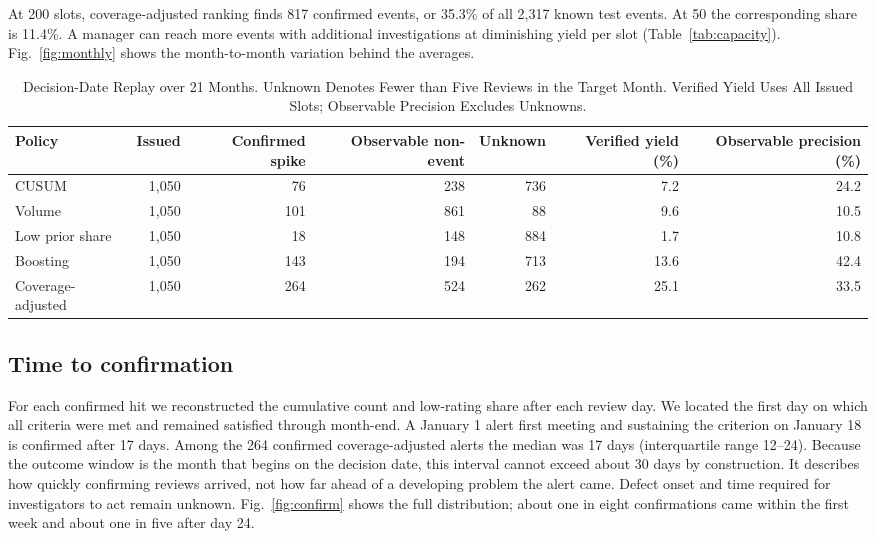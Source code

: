 \documentclass[conference]{IEEEtran}
\begin{document}
At 200 slots, coverage-adjusted ranking finds 817 confirmed events, or 35.3\% of all 2,317 known test events. At 50 the corresponding share is 11.4\%. A manager can reach more events with additional investigations at diminishing yield per slot (Table~\ref{tab:capacity}). Fig.~\ref{fig:monthly} shows the month-to-month variation behind the averages.

\begin{table}[t]
\caption{Decision-Date Replay over 21 Months. Unknown Denotes Fewer than Five Reviews in the Target Month. Verified Yield Uses All Issued Slots; Observable Precision Excludes Unknowns.}
\label{tab:replay}
\centering\footnotesize
\begin{tabular}{@{}lrrrrrr@{}}
\toprule
Policy & Issued & Confirmed spike & Observable non-event & Unknown & Verified yield (\%) & Observable precision (\%) \\
\midrule
CUSUM & 1,050 & 76 & 238 & 736 & 7.2 & 24.2 \\
Volume & 1,050 & 101 & 861 & 88 & 9.6 & 10.5 \\
Low prior share & 1,050 & 18 & 148 & 884 & 1.7 & 10.8 \\
Boosting & 1,050 & 143 & 194 & 713 & 13.6 & 42.4 \\
Coverage-adjusted & 1,050 & 264 & 524 & 262 & 25.1 & 33.5 \\
\bottomrule
\end{tabular}
\end{table}

\subsection{Time to confirmation}
For each confirmed hit we reconstructed the cumulative count and low-rating share after each review day. We located the first day on which all criteria were met and remained satisfied through month-end. A January 1 alert first meeting and sustaining the criterion on January 18 is confirmed after 17 days. Among the 264 confirmed coverage-adjusted alerts the median was 17 days (interquartile range 12--24). Because the outcome window is the month that begins on the decision date, this interval cannot exceed about 30 days by construction. It describes how quickly confirming reviews arrived, not how far ahead of a developing problem the alert came. Defect onset and time required for investigators to act remain unknown. Fig.~\ref{fig:confirm} shows the full distribution; about one in eight confirmations came within the first week and about one in five after day 24.
\end{document}
